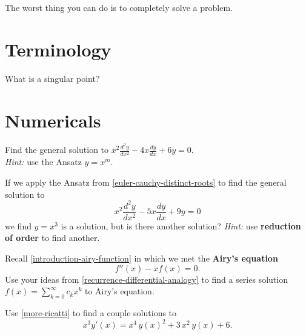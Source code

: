 \documentclass{homework}
\author{Jim Fowler}
\begin{document}
\maketitle

\begin{inspiration}
  The worst thing you can do is to completely solve a problem.
\end{inspiration}

\section{Terminology}

\begin{problem}\label{defn-singular-point}What is a singular point?
\end{problem}

\section{Numericals}

\begin{problem}\label{euler-cauchy-distinct-roots}Find the general solution to \(x^{2}{\displaystyle\frac  {d^{2}y}{dx^{2}}}-4x{\displaystyle\frac  {dy}{dx}}+6y=0\).\\
  \textit{Hint:} use the Ansatz $y = x^m$.
\end{problem}

\begin{problem}\label{euler-cauchy-single-root}If we apply the Ansatz from
  \ref{euler-cauchy-distinct-roots} to find the general solution to
  \[ 
    x^{2}{\frac  {d^{2}y}{dx^{2}}}-5x{\frac  {dy}{dx}}+9y=0
  \]
  we find $y = x^3$ is a solution, but is there another solution?  \textit{Hint:} use  \textbf{reduction of order} to find another.
\end{problem}

\begin{problem}Recall \ref{introduction-airy-function} in which we met the \textbf{Airy's equation}
  \[
    f''(x) - x f(x) = 0.
  \]
  Use your ideas from \ref{recurrence-differential-analogy} to find a series solution $f(x) = \sum_{k=0}^\infty c_k x^k$ to Airy's equation.
\end{problem}


\begin{problem}Use \ref{more-ricatti} to find a couple solutions to
  \[
    x^3 y'(x) = x^4 \, y(x)^2 + 3 \, x^2 \, y(x) + 6.
  \]
\end{problem}
\end{document}
